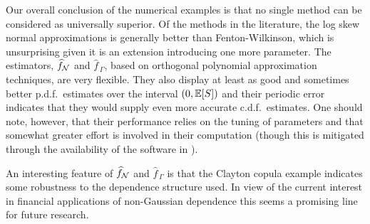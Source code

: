 


Our overall conclusion of the numerical examples is that no single method can
be considered as universally superior. Of the methods in the literature,
the log skew normal approximations is generally better than Fenton-Wilkinson,
which is unsurprising given it is an extension introducing one more parameter.
The estimators, $\widehat{f}_{\mathcal{N}}$ and $\widehat{f}_{\,\Gamma}$, based on orthogonal polynomial approximation techniques, are very flexible. They also display at least as good and sometimes better p.d.f.\ estimates over the interval $(0, \operatorname{{\mathbb E}}[S])$ and their periodic error indicates that they would supply even more accurate c.d.f.\ estimates. One should note, however, that their
performance relies on the tuning of parameters and that somewhat
greater effort is involved in their computation (though this is mitigated through the availability
of the software in \cite{Code}).

An interesting feature of $\widehat{f}_{\mathcal{N}}$ and $\widehat{f}_{\,\Gamma}$ is that
the Clayton copula example indicates some robustness to the dependence structure used.
In view of the current interest in financial applications of non-Gaussian dependence this
seems a promising line for future research.


